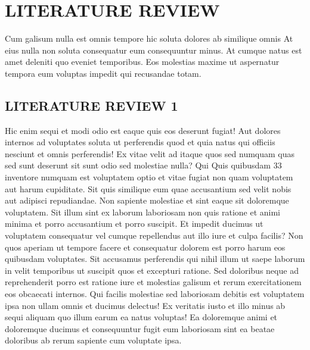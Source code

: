 \documentclass[a4paper,12pt]{report}
\begin{document}
\chapter{LITERATURE REVIEW}
\hspace{.5cm}Cum galisum nulla est omnis tempore hic soluta dolores ab similique omnis At eius nulla non soluta consequatur eum consequuntur minus. At cumque natus est amet deleniti quo eveniet temporibus. Eos molestias maxime ut aspernatur tempora eum voluptas impedit qui recusandae totam.

\section{LITERATURE REVIEW 1}
\hspace{.5cm}Hic enim sequi et modi odio est eaque quis eos deserunt fugiat! Aut dolores internos ad voluptates soluta ut perferendis quod et quia natus qui officiis nesciunt et omnis perferendis! Ex vitae velit ad itaque quos sed numquam quas sed sunt deserunt sit sunt odio sed molestiae nulla? Qui Quis quibusdam 33 inventore numquam est voluptatem optio et vitae fugiat non quam voluptatem aut harum cupiditate. Sit quis similique eum quae accusantium sed velit nobis aut adipisci repudiandae. Non sapiente molestiae et sint eaque sit doloremque voluptatem. Sit illum sint ex laborum laboriosam non quis ratione et animi minima et porro accusantium et porro suscipit. Et impedit ducimus ut voluptatem consequatur vel cumque repellendus aut illo iure et culpa facilis? Non quos aperiam ut tempore facere et consequatur dolorem est porro harum eos quibusdam voluptates. Sit accusamus perferendis qui nihil illum ut saepe laborum in velit temporibus ut suscipit quos et excepturi ratione. Sed doloribus neque ad reprehenderit porro est ratione iure et molestias galisum et rerum exercitationem eos obcaecati internos. Qui facilis molestiae sed laboriosam debitis est voluptatem ipsa non ullam omnis et ducimus delectus! Ex veritatis iusto et illo minus ab sequi aliquam quo illum earum ea natus voluptas! Ea doloremque animi et doloremque ducimus et consequuntur fugit eum laboriosam sint ea beatae doloribus ab rerum sapiente cum voluptate ipsa. 
\end{document}

